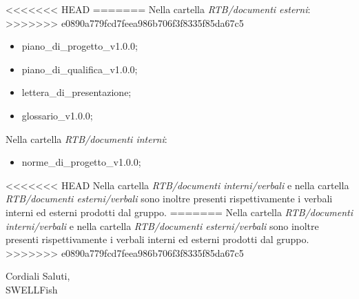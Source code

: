 \documentclass[12pt]{article}
\begin{document}
<<<<<<< HEAD
=======
Nella cartella \textit{RTB/documenti esterni}:
>>>>>>> e0890a779fcd7feea986b706f3f8335f85da67c5
\begin{itemize}
\item piano\_di\_progetto\_v1.0.0;
\item piano\_di\_qualifica\_v1.0.0;
\item lettera\_di\_presentazione;
\item glossario\_v1.0.0;
\end{itemize}
Nella cartella \textit{RTB/documenti interni}:
\begin{itemize}
    \item norme\_di\_progetto\_v1.0.0;
\end{itemize}
<<<<<<< HEAD
 Nella cartella \textit{RTB/documenti interni/verbali} e nella cartella \textit{RTB/documenti esterni/verbali} sono inoltre presenti rispettivamente i verbali interni ed esterni prodotti dal gruppo. 
=======
 Nella cartella \textit{RTB/documenti interni/verbali} e nella cartella \textit{ RTB/documenti
esterni/verbali} sono inoltre presenti rispettivamente i verbali interni ed esterni prodotti dal gruppo. 
>>>>>>> e0890a779fcd7feea986b706f3f8335f85da67c5

\begin{flushright}
Cordiali Saluti,\\
SWELLFish
\end{flushright}
\end{document}
